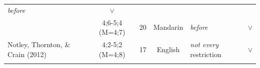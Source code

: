 \documentclass[oneside]{report}
\theoremstyle{definition}
\theoremstyle{definition}
\theoremstyle{definition}
\theoremstyle{remark}
\begin{document}
\begin{longtable}[]{@{}lccclc@{}}
\begin{minipage}[t]{0.25\columnwidth}
\emph{before}\strut
\end{minipage} & \begin{minipage}[t]{0.13\columnwidth}\centering\strut
\(\lor\)\strut
\end{minipage}\tabularnewline
\begin{minipage}[t]{0.23\columnwidth}\raggedright\strut
\strut
\end{minipage} & \begin{minipage}[t]{0.07\columnwidth}\centering\strut
4;6-5;4 (M=4;7)\strut
\end{minipage} & \begin{minipage}[t]{0.05\columnwidth}\centering\strut
20\strut
\end{minipage} & \begin{minipage}[t]{0.10\columnwidth}\centering\strut
Mandarin\strut
\end{minipage} & \begin{minipage}[t]{0.25\columnwidth}\raggedright\strut
\emph{before}\strut
\end{minipage} & \begin{minipage}[t]{0.13\columnwidth}\centering\strut
\(\lor\)\strut
\end{minipage}\tabularnewline
\begin{minipage}[t]{0.23\columnwidth}\raggedright\strut
Notley, Thornton, \& Crain (2012)\strut
\end{minipage} & \begin{minipage}[t]{0.07\columnwidth}\centering\strut
4;2-5;2 (M=4;8)\strut
\end{minipage} & \begin{minipage}[t]{0.05\columnwidth}\centering\strut
17\strut
\end{minipage} & \begin{minipage}[t]{0.10\columnwidth}\centering\strut
English\strut
\end{minipage} & \begin{minipage}[t]{0.25\columnwidth}\raggedright\strut
\emph{not every} restriction\strut
\end{minipage} & \begin{minipage}[t]{0.13\columnwidth}\centering\strut
\(\lor\)\strut
\end{minipage}\tabularnewline
\begin{minipage}[t]{0.23\columnwidth}\raggedright\strut
\strut
\end{minipage} & \begin{minipage}[t]{0.07\columnwidth}\centering\strut
\strut
\end{minipage} & \begin{minipage}[t]{0.05\columnwidth}\centering\strut

\end{minipage}
\end{longtable}
\end{document}
